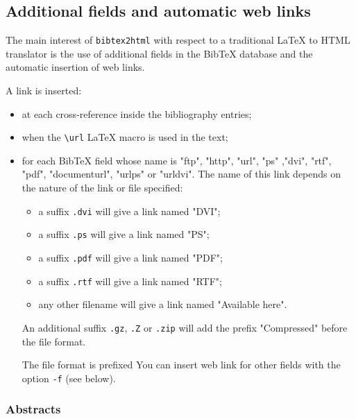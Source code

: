 \documentclass[11pt,a4paper]{article}
\begin{document}

\subsection{Additional fields and automatic web links}

The main interest of \texttt{bibtex2html} with respect to a
traditional LaTeX to HTML translator is the use of additional fields
in the BibTeX database and the automatic insertion of web
links.

A link is inserted:
\begin{itemize}

\item  at each cross-reference inside the bibliography entries; 

\item  when the \verb|\url| LaTeX macro is used in the text; 

\item  for each BibTeX field whose name is "ftp", "http", "url", "ps"
  ,"dvi", "rtf", "pdf",
  "documenturl", "urlps" or "urldvi". The name of this link depends on
  the nature of the link or file specified: 
  \begin{itemize}
  \item a suffix \texttt{.dvi} will give a link named "DVI";
  \item a suffix \texttt{.ps} will give a link named "PS";
  \item a suffix \texttt{.pdf} will give a link named "PDF";
  \item a suffix \texttt{.rtf} will give a link named "RTF";
  \item any other filename will give a link named "Available here".
  \end{itemize}
  
  An additional suffix \texttt{.gz}, \texttt{.Z} or
  \texttt{.zip} will add the prefix "Compressed" before the
  file format.

  The file format is prefixed 
  You can insert web link for other fields with the option
  \texttt{-f} (see below).
  
\end{itemize}



\subsubsection{Abstracts}
\end{document}
